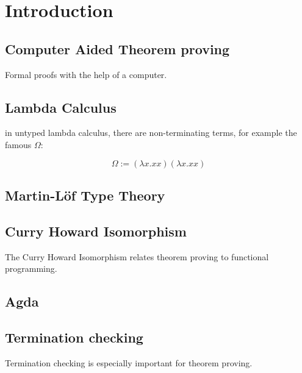 \chapter{Introduction}
\section {Computer Aided Theorem proving}
Formal proofs with the help of a computer.
\section{Lambda Calculus}

in untyped lambda calculus, there are non-terminating terms, for example the famous \( \Omega \):

\[ \Omega := (\lambda x . x x) (\lambda x . x x) \]


\section{Martin-L\"of Type Theory}
\section {Curry Howard Isomorphism}
The Curry Howard Isomorphism relates theorem proving to functional programming.
\section{Agda}
\section {Termination checking}
Termination checking is especially important for theorem proving.


